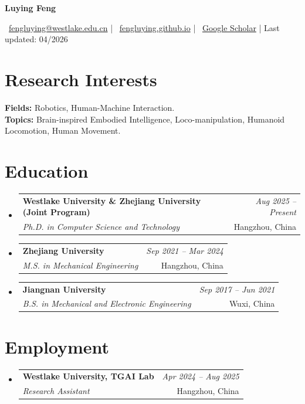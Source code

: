 \documentclass[a4paper,11pt]{article}
\makeatletter
\newcommand{\resumeSubheading}[4]{
\vspace{0.5mm}\item
    \begin{tabular*}{0.98\textwidth}[t]{l@{\extracolsep{\fill}}r}
        \textbf{#1} & \textit{\footnotesize{#4}} \\
        \textit{\footnotesize{#3}} &  \footnotesize{#2}\\
    \end{tabular*}
    \vspace{-2.4mm}
}
\newcommand{\resumeSubHeadingListStart}{\begin{itemize}[leftmargin=*,labelsep=1mm]}
\newcommand{\resumeSubHeadingListEnd}{\end{itemize}\vspace{1mm}}
\makeatother
\begin{document}
\begin{center}
    {\Huge\textbf{Luying Feng}}
\end{center}
\vspace{-6mm}

\begin{center}
    \small{
    \faEnvelope\ \href{mailto:fengluying@westlake.edu.cn}{fengluying@westlake.edu.cn} |
    \faHome\ \href{https://fengluying.github.io}{fengluying.github.io} |
    \faGraduationCap\ \href{https://scholar.google.com/citations?user=6KSkQKEAAAAJ&hl=zh-CN&oi=sra}{Google Scholar} |
    Last updated: 04/2026
    }
\end{center}
\vspace{-4mm}

\section{\textbf{Research Interests}}
\small{
\textbf{Fields:} Robotics, Human-Machine Interaction.\\
\textbf{Topics:} Brain-inspired Embodied Intelligence, Loco-manipulation, Humanoid Locomotion, Human Movement.
}
\vspace{1mm}

\section{\textbf{Education}}
\resumeSubHeadingListStart
\resumeSubheading
{Westlake University \& Zhejiang University (Joint Program)}{Hangzhou, China}
{Ph.D. in Computer Science and Technology}{Aug 2025 -- Present}
\resumeSubheading
{Zhejiang University}{Hangzhou, China}
{M.S. in Mechanical Engineering}{Sep 2021 -- Mar 2024}
\resumeSubheading
{Jiangnan University}{Wuxi, China}
{B.S. in Mechanical and Electronic Engineering}{Sep 2017 -- Jun 2021}
\resumeSubHeadingListEnd

\section{\textbf{Employment}}
\resumeSubHeadingListStart
\resumeSubheading
{Westlake University, TGAI Lab}{Hangzhou, China}
{Research Assistant}{Apr 2024 -- Aug 2025}
\resumeSubHeadingListEnd
\end{document}
